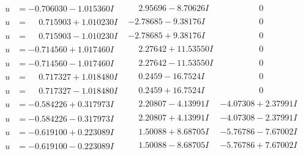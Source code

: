 \documentclass[1p]{elsarticle_modified}
\theoremstyle{definition}
\begin{document}
$$\begin{array}{c|c|c}
\begin{aligned}
u &= -0.706030 - 1.015360 I\end{aligned}
 & \phantom{-}2.95696 - 8.70626 I & \phantom{-0.000000 } 0 \\ \hline\begin{aligned}
u &= \phantom{-}0.715903 + 1.010230 I\end{aligned}
 & -2.78685 - 9.38176 I & \phantom{-0.000000 } 0 \\ \hline\begin{aligned}
u &= \phantom{-}0.715903 - 1.010230 I\end{aligned}
 & -2.78685 + 9.38176 I & \phantom{-0.000000 } 0 \\ \hline\begin{aligned}
u &= -0.714560 + 1.017460 I\end{aligned}
 & \phantom{-}2.27642 + 11.53550 I & \phantom{-0.000000 } 0 \\ \hline\begin{aligned}
u &= -0.714560 - 1.017460 I\end{aligned}
 & \phantom{-}2.27642 - 11.53550 I & \phantom{-0.000000 } 0 \\ \hline\begin{aligned}
u &= \phantom{-}0.717327 + 1.018480 I\end{aligned}
 & \phantom{-}0.2459 - 16.7524 I & \phantom{-0.000000 } 0 \\ \hline\begin{aligned}
u &= \phantom{-}0.717327 - 1.018480 I\end{aligned}
 & \phantom{-}0.2459 + 16.7524 I & \phantom{-0.000000 } 0 \\ \hline\begin{aligned}
u &= -0.584226 + 0.317973 I\end{aligned}
 & \phantom{-}2.20807 - 4.13991 I & -4.07308 + 2.37991 I \\ \hline\begin{aligned}
u &= -0.584226 - 0.317973 I\end{aligned}
 & \phantom{-}2.20807 + 4.13991 I & -4.07308 - 2.37991 I \\ \hline\begin{aligned}
u &= -0.619100 + 0.223089 I\end{aligned}
 & \phantom{-}1.50088 + 8.68705 I & -5.76786 - 7.67002 I \\ \hline\begin{aligned}
u &= -0.619100 - 0.223089 I\end{aligned}
 & \phantom{-}1.50088 - 8.68705 I & -5.76786 + 7.67002 I \\ \hline\begin{aligned}

\end{aligned}
\end{array}$$
\end{document}
